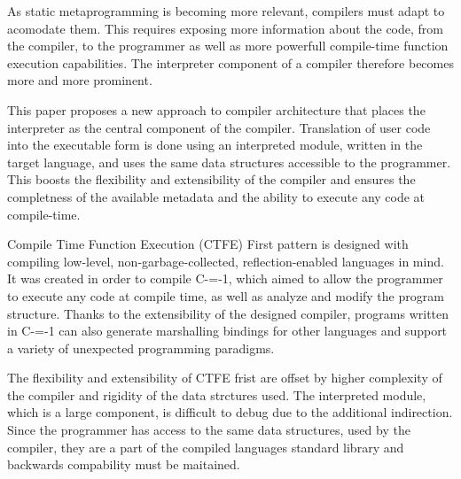 As static metaprogramming is becoming more relevant, compilers must adapt to acomodate them.
This requires exposing more information about the code, from the compiler, to the programmer as well as more powerfull compile-time function execution capabilities.
The interpreter component of a compiler therefore becomes more and more prominent.

This paper proposes a new approach to compiler architecture that places the interpreter as the central component of the compiler.
Translation of user code into the executable form is done using an interpreted module, written in the target language, and uses the same data structures accessible to the programmer.
This boosts the flexibility and extensibility of the compiler and ensures the completness of the available metadata and the ability to execute any code at compile-time.

Compile Time Function Execution (CTFE) First pattern is designed with compiling low-level, non-garbage-collected, reflection-enabled languages in mind.
It was created in order to compile C-=-1, which aimed to allow the programmer to execute any code at compile time, as well as analyze and modify the program structure.
Thanks to the extensibility of the designed compiler, programs written in C-=-1 can also generate marshalling bindings for other languages and support a variety of unexpected programming paradigms.

The flexibility and extensibility of CTFE frist are offset by higher complexity of the compiler and rigidity of the data strctures used.
The interpreted module, which is a large component, is difficult to debug due to the additional indirection.
Since the programmer has access to the same data structures, used by the compiler, they are a part of the compiled languages standard library and backwards compability must be maitained.
